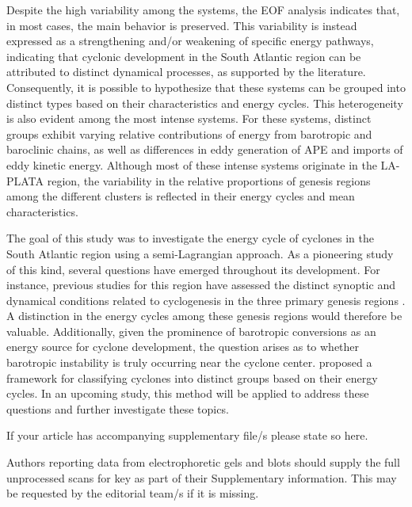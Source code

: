 \documentclass[pdflatex,sn-chicago]{sn-jnl}%
\theoremstyle{plain}
\theoremstyle{definition}
\theoremstyle{remark}
\theoremstyle{definition}
\begin{document}
Despite the high variability among the systems, the EOF analysis indicates that, in most cases, the main behavior is preserved. This variability is instead expressed as a strengthening and/or weakening of specific energy pathways, indicating that cyclonic development in the South Atlantic region can be attributed to distinct dynamical processes, as supported by the literature. Consequently, it is possible to hypothesize that these systems can be grouped into distinct types based on their characteristics and energy cycles. This heterogeneity is also evident among the most intense systems. For these systems, distinct groups exhibit varying relative contributions of energy from barotropic and baroclinic chains, as well as differences in eddy generation of APE and imports of eddy kinetic energy. Although most of these intense systems originate in the LA-PLATA region, the variability in the relative proportions of genesis regions among the different clusters is reflected in their energy cycles and mean characteristics.

The goal of this study was to investigate the energy cycle of cyclones in the South Atlantic region using a semi-Lagrangian approach. As a pioneering study of this kind, several questions have emerged throughout its development. For instance, previous studies for this region have assessed the distinct synoptic and dynamical conditions related to cyclogenesis in the three primary genesis regions \citep{gramcianinov2019properties,crespo2021potential}. A distinction in the energy cycles among these genesis regions would therefore be valuable. Additionally, given the prominence of barotropic conversions as an energy source for cyclone development, the question arises as to whether barotropic instability is truly occurring near the cyclone center. \citet{souza2024thesis} proposed a framework for classifying cyclones into distinct groups based on their energy cycles. In an upcoming study, this method will be applied to address these questions and further investigate these topics.


\backmatter


If your article has accompanying supplementary file/s please state so here. 

Authors reporting data from electrophoretic gels and blots should supply the full unprocessed scans for key as part of their Supplementary information. This may be requested by the editorial team/s if it is missing.
\end{document}
